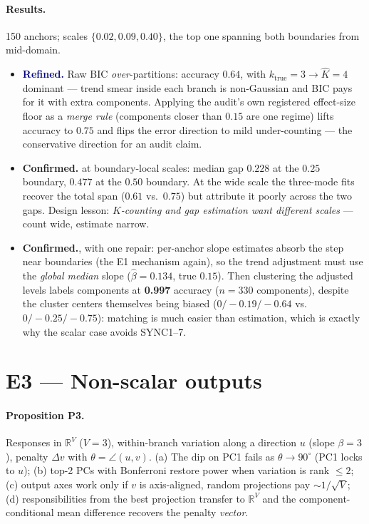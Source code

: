 \documentclass[11pt]{article}
\newcommand{\R}{\mathbb{R}}
\newcommand{\confirmed}{\textcolor{ok}{\textbf{Confirmed.}}}
\newcommand{\refined}{\textcolor{navy}{\textbf{Refined.}}}
\begin{document}
\paragraph{Results.} 150 anchors; scales $\{0.02,0.09,0.40\}$, the top one spanning both
boundaries from mid-domain.
\begin{itemize}[leftmargin=1.8em,itemsep=1pt]
  \item[(a)] \refined{} Raw BIC \emph{over}-partitions: accuracy $0.64$, with
  $k_{\mathrm{true}}{=}3\to\widehat K{=}4$ dominant --- trend smear inside each branch is
  non-Gaussian and BIC pays for it with extra components. Applying the audit's own
  registered effect-size floor as a \emph{merge rule} (components closer than $0.15$ are
  one regime) lifts accuracy to $0.75$ and flips the error direction to mild
  under-counting --- the conservative direction for an audit claim.
  \item[(b)] \confirmed{} at boundary-local scales: median gap $0.228$ at the $0.25$
  boundary, $0.477$ at the $0.50$ boundary. At the wide scale the three-mode fits recover
  the total span ($0.61$ vs.\ $0.75$) but attribute it poorly across the two gaps.
  Design lesson: \emph{$K$-counting and gap estimation want different scales} --- count
  wide, estimate narrow.
  \item[(c)] \confirmed{}, with one repair: per-anchor slope estimates absorb the step near
  boundaries (the E1 mechanism again), so the trend adjustment must use the \emph{global
  median} slope ($\widehat\beta=0.134$, true $0.15$). Then clustering the adjusted levels
  labels components at \textbf{0.997} accuracy ($n=330$ components), despite the cluster
  centers themselves being biased ($0/-0.19/-0.64$ vs.\ $0/-0.25/-0.75$): matching is much
  easier than estimation, which is exactly why the scalar case avoids SYNC1--7.
\end{itemize}

\section{E3 --- Non-scalar outputs}

\paragraph{Proposition P3.} Responses in $\R^V$ ($V{=}3$), within-branch variation along a
direction $u$ (slope $\beta{=}3$), penalty $\Delta v$ with
$\theta=\angle(u,v)$. (a) The dip on PC1 fails as $\theta\to 90^\circ$ (PC1 locks to $u$);
(b) top-2 PCs with Bonferroni restore power when variation is rank $\le 2$; (c) output axes
work only if $v$ is axis-aligned, random projections pay $\sim 1/\sqrt V$; (d)
responsibilities from the best projection transfer to $\R^V$ and the component-conditional
mean difference recovers the penalty \emph{vector}.
\end{document}
